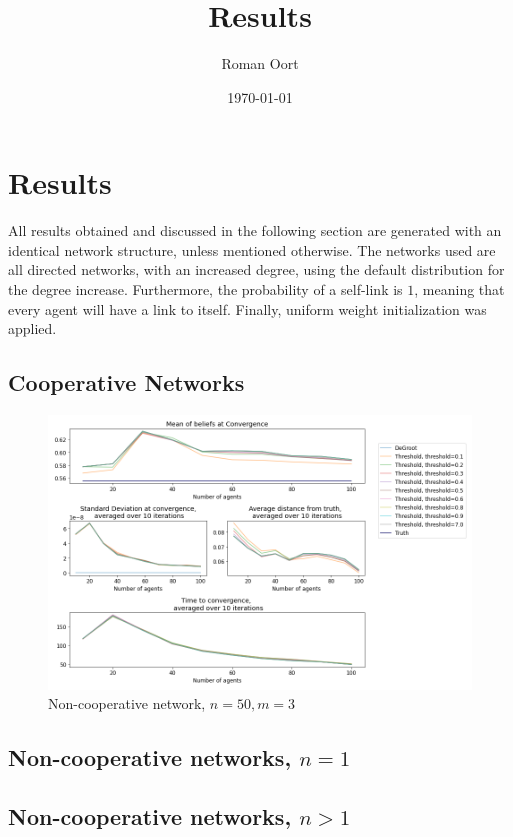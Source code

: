 \documentclass{article}
\title{Results}
\author{Roman Oort}
\date{\today}
\begin{document}
\maketitle

\tableofcontents
\newpage
\section{Results}

All results obtained and discussed in the following section are generated with an identical network structure, unless mentioned otherwise. The networks used are all directed networks, with an increased degree, using the default distribution for the degree increase. Furthermore, the probability of a self-link is $1$, meaning that every agent will have a link to itself. Finally, uniform weight initialization was applied.

\subsection{Cooperative Networks}

\begin{center}
    \begin{figure}[!htbp]
        \centering
        \includegraphics[width=1.2\textwidth]{ThesisKI/Images/WisdomCompare.png}
        \caption{Non-cooperative network, $n=50, m=3$}
        \label{network:noncoop}
    \end{figure}
\end{center}


\subsection{Non-cooperative networks, $n=1$}

\subsection{Non-cooperative networks, $n > 1$}
\end{document}
